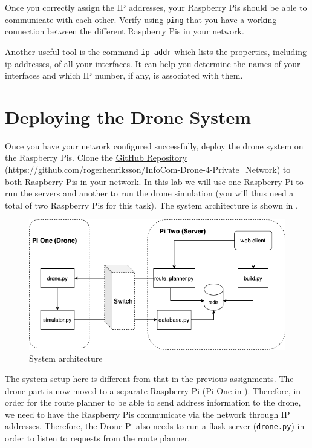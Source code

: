 \documentclass{article}
\begin{document}
\noindent Once you correctly assign the IP addresses, your Raspberry Pis should be able to communicate with each other. Verify using \verb!ping! that you have a working connection between the different Raspberry Pis in your network.

Another useful tool is the command \verb!ip addr! which lists the properties, including ip addresses, of all your interfaces. It can help you determine the names of your interfaces and which IP number, if any, is associated with them.

\section{Deploying the Drone System}
Once you have your network configured successfully, deploy the drone system on the Raspberry Pis. Clone the {\color{blue}\href{https://github.com/rogerhenriksson/InfoCom-Drone-4-Private_Network}{GitHub Repository}} (\href{https://github.com/rogerhenriksson/InfoCom-Drone-4-Private_Network}{https://github.com/rogerhenriksson/InfoCom-Drone-4-Private\_Network}) to both Raspberry Pis in your network. In this lab we will use one Raspberry Pi to run the servers and another to run the drone simulation (you will thus need a total of two Raspberry Pis for this task). The system architecture is shown in .
\begin{figure}
    \centering
    \includegraphics[width=\linewidth]{architecture.png}
    \caption{System architecture}
    \label{fig:sys}
\end{figure}

The system setup here is different from that in the previous assignments. The drone part is now moved to a separate Raspberry Pi (Pi One in ). Therefore, in order for the route planner to be able to send address information to the drone, we need to have the Raspberry Pis communicate via the network through IP addresses. Therefore, the Drone Pi also needs to run a flask server (\verb!drone.py!) in order to listen to requests from the route planner.
\end{document}
